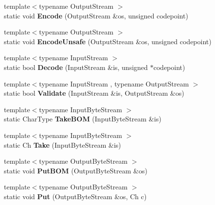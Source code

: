 \begin{DoxyCompactItemize}
\item 
\mbox{\label{structASCII_af56b1605fe233c54693facc7de457f72}} 
{\footnotesize template$<$typename Output\+Stream $>$ }\\static void {\bfseries Encode} (Output\+Stream \&os, unsigned codepoint)
\item 
\mbox{\label{structASCII_afeb90d6f04771067b83b35a0f366af46}} 
{\footnotesize template$<$typename Output\+Stream $>$ }\\static void {\bfseries Encode\+Unsafe} (Output\+Stream \&os, unsigned codepoint)
\item 
\mbox{\label{structASCII_a44844bbfd0a4fc282993fd72f3f58eee}} 
{\footnotesize template$<$typename Input\+Stream $>$ }\\static bool {\bfseries Decode} (Input\+Stream \&is, unsigned $\ast$codepoint)
\item 
\mbox{\label{structASCII_a398680588a09e6ce9b56e32195047c78}} 
{\footnotesize template$<$typename Input\+Stream , typename Output\+Stream $>$ }\\static bool {\bfseries Validate} (Input\+Stream \&is, Output\+Stream \&os)
\item 
\mbox{\label{structASCII_aad78500eb98f45582a4df020e3fb2278}} 
{\footnotesize template$<$typename Input\+Byte\+Stream $>$ }\\static Char\+Type {\bfseries Take\+B\+OM} (Input\+Byte\+Stream \&is)
\item 
\mbox{\label{structASCII_ab1b9fdf0a5c05658d62fded913d923a3}} 
{\footnotesize template$<$typename Input\+Byte\+Stream $>$ }\\static Ch {\bfseries Take} (Input\+Byte\+Stream \&is)
\item 
\mbox{\label{structASCII_a3036dc1d604039c3224ca0a890ee0134}} 
{\footnotesize template$<$typename Output\+Byte\+Stream $>$ }\\static void {\bfseries Put\+B\+OM} (Output\+Byte\+Stream \&os)
\item 
\mbox{\label{structASCII_a218b244b9cd961ea6c5775a734cec20e}} 
{\footnotesize template$<$typename Output\+Byte\+Stream $>$ }\\static void {\bfseries Put} (Output\+Byte\+Stream \&os, Ch c)
\end{DoxyCompactItemize}



